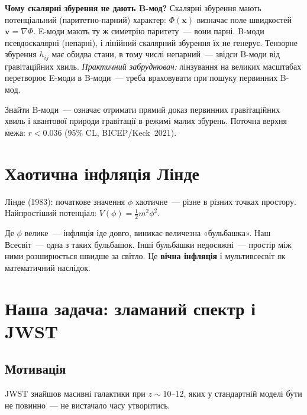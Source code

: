 \documentclass[12pt, a4paper]{article}
\begin{document}
\begin{keybox}
\textbf{Чому скалярні збурення не дають B-мод?}
Скалярні збурення мають потенціальний (паритетно-парний) характер:
$\Phi(\mathbf{x})$ визначає поле швидкостей $\mathbf{v} = \nabla\Phi$.
E-моди мають ту ж симетрію паритету~--- вони парні.
B-моди псевдоскалярні (непарні), і лінійний скалярний збурення їх не генерує.
Тензорне збурення $h_{ij}$ має обидва стани, в тому числі непарний~---
звідси B-моди від гравітаційних хвиль.
\textit{Практичний забруднювач:} лінзування на великих масштабах перетворює
E-моди в B-моди~--- треба враховувати при пошуку первинних B-мод.
\end{keybox}

Знайти B-моди~--- означає отримати прямий доказ первинних гравітаційних хвиль
і квантової природи гравітації в режимі малих збурень.
Поточна верхня межа: $r < 0.036$ (95\% CL, BICEP/Keck~2021).

\section{Хаотична інфляція Лінде}
\label{sec:chaotic}

Лінде (1983): початкове значення $\phi$ хаотичне~--- різне в різних точках простору.
Найпростіший потенціал: $V(\phi) = \frac{1}{2}m^2\phi^2$.

Де $\phi$ велике~--- інфляція іде довго, виникає величезна «бульбашка».
Наш Всесвіт~--- одна з таких бульбашок. Інші бульбашки недосяжні~---
простір між ними розширюється швидше за світло.
Це \textbf{вічна інфляція} і мультивсесвіт як математичний наслідок.

\section{Наша задача: зламаний спектр і JWST}
\label{sec:broken}

\subsection{Мотивація}

JWST знайшов масивні галактики при $z \sim 10$--$12$, яких у стандартній
моделі бути не повинно~--- не вистачало часу утворитись.
\end{document}
